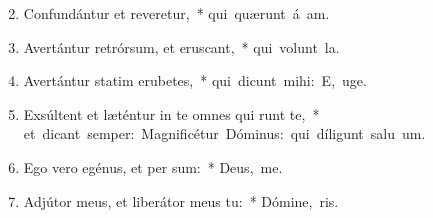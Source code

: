 \begin{flushleft}
\begin{enumerate}[leftmargin=*]
\setcounter{enumi}{1}


\item Confundántur et reveretur,~* \mbox{qui quærunt á am.}
\item Avertántur retrórsum, et eruscant,~* \mbox{qui volunt  la.}
\item Avertántur statim erubetes,~* \mbox{qui dicunt mihi: E, uge.}
\item Exsúltent et læténtur in te omnes qui runt te,~* \mbox{et dicant semper: Magnificétur Dóminus: qui díligunt salu um.}
\item Ego vero egénus, et per sum:~* \mbox{Deus,  me.}
\item Adjútor meus, et liberátor meus  tu:~* \mbox{Dómine,  ris.}

\end{enumerate}
\end{flushleft}

